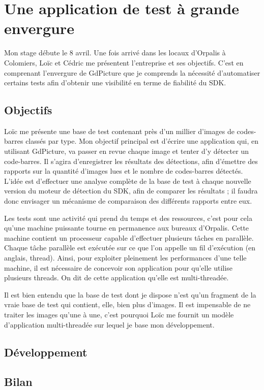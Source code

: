 \chapter{Une application de test à grande envergure}

Mon stage débute le 8 avril. Une fois arrivé dans les locaux d'Orpalis à Colomiers, Loïc et Cédric me présentent l'entreprise et ses objectifs.
C'est en comprenant l'envergure de GdPicture que je comprends la nécessité d'automatiser certains tests afin d'obtenir une visibilité en terme de fiabilité du SDK.

\section{Objectifs}

Loïc me présente une base de test contenant près d'un millier d'images de codes-barres classés par type.
Mon objectif principal est d'écrire une application qui, en utilisant GdPicture, va passer en revue chaque image et tenter d'y détecter un code-barres.
Il s'agira d'enregistrer les résultats des détections, afin d'émettre des rapports sur la quantité d'images lues et le nombre de codes-barres détectés.
L'idée est d'effectuer une analyse complète de la base de test à chaque nouvelle version du moteur de détection du SDK, afin de comparer les résultats ; il faudra donc envisager un mécanisme de comparaison des différents rapports entre eux.

Les tests sont une activité qui prend du temps et des ressources, c'est pour cela qu'une machine puissante tourne en permanence aux bureaux d'Orpalis.
Cette machine contient un processeur capable d'effectuer plusieurs tâches en parallèle. Chaque tâche parallèle est exécutée sur ce que l'on appelle un fil d'exécution (en anglais, \og thread\fg ).
Ainsi, pour exploiter pleinement les performances d'une telle machine, il est nécessaire de concevoir son application pour qu'elle utilise plusieurs threads. On dit de cette application qu'elle est multi-threadée.

Il est bien entendu que la base de test dont je dispose n'est qu'un fragment de la vraie base de test qui contient, elle, bien plus d'images.
Il est impensable de ne traiter les images qu'une à une, c'est pourquoi Loïc me fournit un modèle d'application multi-threadée sur lequel je base mon développement.

\section{Développement}



\section{Bilan}